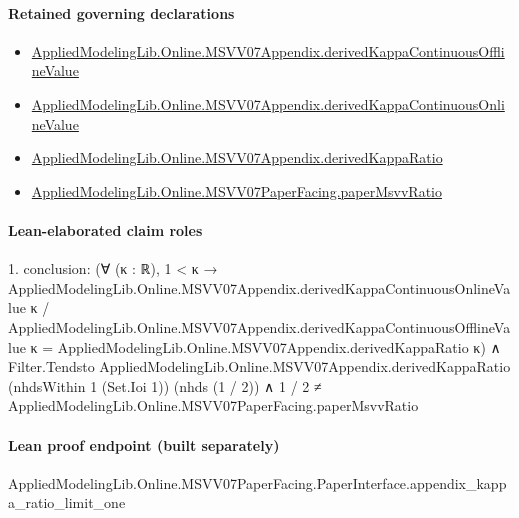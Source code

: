 \documentclass[10pt]{article}
\begin{document}
\paragraph{Retained governing declarations}
\begin{itemize}\raggedright
\item \hyperlink{governing-declaration-0510874bec2af784}{Applied\allowbreak{}Modeling\allowbreak{}Lib.\allowbreak{}Online.\allowbreak{}MSVV07\allowbreak{}Appendix.\allowbreak{}derived\allowbreak{}Kappa\allowbreak{}Continuous\allowbreak{}Offline\allowbreak{}Value}
\item \hyperlink{governing-declaration-c85b36feb7782e32}{Applied\allowbreak{}Modeling\allowbreak{}Lib.\allowbreak{}Online.\allowbreak{}MSVV07\allowbreak{}Appendix.\allowbreak{}derived\allowbreak{}Kappa\allowbreak{}Continuous\allowbreak{}Online\allowbreak{}Value}
\item \hyperlink{governing-declaration-95a6e05cf6f7d278}{Applied\allowbreak{}Modeling\allowbreak{}Lib.\allowbreak{}Online.\allowbreak{}MSVV07\allowbreak{}Appendix.\allowbreak{}derived\allowbreak{}Kappa\allowbreak{}Ratio}
\item \hyperlink{governing-declaration-11865634591d1a39}{Applied\allowbreak{}Modeling\allowbreak{}Lib.\allowbreak{}Online.\allowbreak{}MSVV07\allowbreak{}Paper\allowbreak{}Facing.\allowbreak{}paper\allowbreak{}Msvv\allowbreak{}Ratio}
\end{itemize}
\paragraph{Lean-elaborated claim roles}\begin{ReviewVerbatim}
1. conclusion: (∀ (κ : ℝ),
    1 < κ →
      AppliedModelingLib.Online.MSVV07Appendix.derivedKappaContinuousOnlineValue κ /
          AppliedModelingLib.Online.MSVV07Appendix.derivedKappaContinuousOfflineValue κ =
        AppliedModelingLib.Online.MSVV07Appendix.derivedKappaRatio κ) ∧
  Filter.Tendsto AppliedModelingLib.Online.MSVV07Appendix.derivedKappaRatio (nhdsWithin 1 (Set.Ioi 1)) (nhds (1 / 2)) ∧
    1 / 2 ≠ AppliedModelingLib.Online.MSVV07PaperFacing.paperMsvvRatio
\end{ReviewVerbatim}

\paragraph{Lean proof endpoint (built separately)}\begin{ReviewVerbatim}
AppliedModelingLib.Online.MSVV07PaperFacing.PaperInterface.appendix_kappa_ratio_limit_one
\end{ReviewVerbatim}
\end{document}
